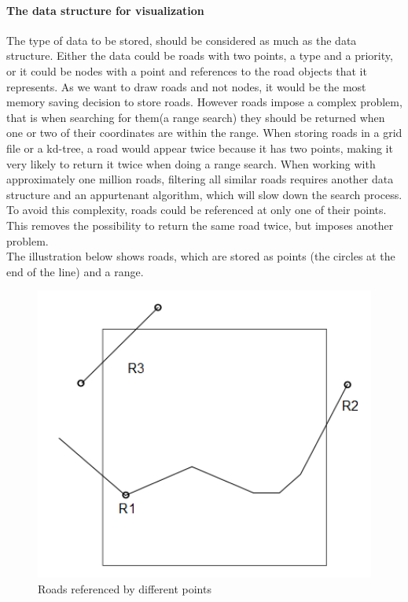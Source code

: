 \documentclass[a4paper,10pt,titlepage]{article}
\begin{document}
\paragraph{The data structure for visualization}

The type of data to be stored, should be considered as much as the data structure. Either the data could be roads with two points, a type and a priority, or it could be nodes with a point and references to the road objects that it represents. As we want to draw roads and not nodes, it would be the most memory saving decision to store roads. However roads impose a complex problem, that is when searching for them(a range search) they should be returned when one or two of their coordinates are within the range. When storing roads in a grid file or a kd-tree, a road would appear twice because it has two points, making it very likely to return it twice when doing a range search. When working with approximately one million roads, filtering all similar roads requires another data structure and an appurtenant algorithm, which will slow down the search process. To avoid this complexity, roads could be referenced at only one of their points. This removes the possibility to return the same road twice, but imposes another problem.\\
The illustration below shows roads, which are stored as points (the circles at the end of the line) and a range.

\begin{figure}[H]
\includegraphics[width=120mm]{roadsRef.png}
\caption{Roads referenced by different points}
\label{fig:roads}
\end{figure}
\end{document}
